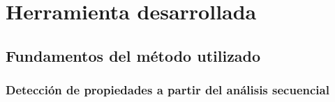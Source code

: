 
\chapter{Herramienta desarrollada}
\label{method}


\section{Fundamentos del método utilizado}
\label{fundamentos}

\subsection{Detección de propiedades a partir del análisis secuencial}





